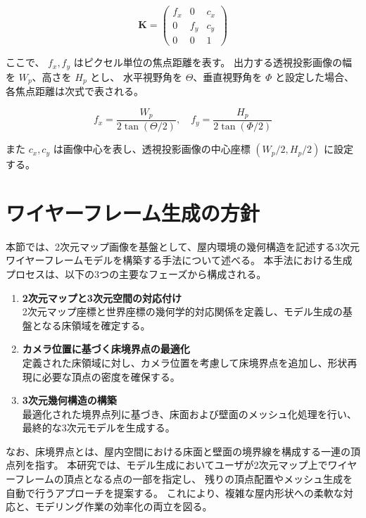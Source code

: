 \begin{equation}
\bm{K} =
\begin{pmatrix}
f_x & 0 & c_x \\
0 & f_y & c_y \\
0 & 0 & 1
\end{pmatrix}
\end{equation}

ここで、 $f_x, f_y$ はピクセル単位の焦点距離を表す。
出力する透視投影画像の幅を $W_p$、高さを $H_p$ とし、
水平視野角を $\Theta$、垂直視野角を $\Phi$ と設定した場合、
各焦点距離は次式で表される。

\begin{equation}
f_x = \frac{W_p}{2 \tan(\Theta/2)}, \quad
f_y = \frac{H_p}{2 \tan(\Phi/2)}
\end{equation}

また $c_x, c_y$ は画像中心を表し、透視投影画像の中心座標 $(W_p/2, H_p/2)$ に設定する。


\section{ワイヤーフレーム生成の方針}

本節では、2次元マップ画像を基盤として、屋内環境の幾何構造を記述する3次元ワイヤーフレームモデルを構築する手法について述べる。
本手法における生成プロセスは、以下の3つの主要なフェーズから構成される。

\begin{enumerate}
  \item \textbf{2次元マップと3次元空間の対応付け} \\
  2次元マップ座標と世界座標の幾何学的対応関係を定義し、モデル生成の基盤となる床領域を確定する。
  
  \item \textbf{カメラ位置に基づく床境界点の最適化} \\
  定義された床領域に対し、カメラ位置を考慮して床境界点を追加し、形状再現に必要な頂点の密度を確保する。
  
  \item \textbf{3次元幾何構造の構築} \\
  最適化された境界点列に基づき、床面および壁面のメッシュ化処理を行い、最終的な3次元モデルを生成する。
\end{enumerate}

なお、床境界点とは、屋内空間における床面と壁面の境界線を構成する一連の頂点列を指す。
本研究では、モデル生成においてユーザが2次元マップ上でワイヤーフレームの頂点となる点の一部を指定し、
残りの頂点配置やメッシュ生成を自動で行うアプローチを提案する。
これにより、複雑な屋内形状への柔軟な対応と、モデリング作業の効率化の両立を図る。

